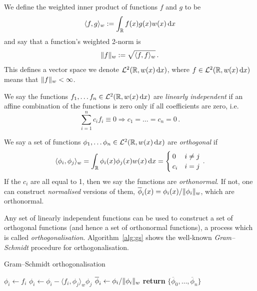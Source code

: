 \begin{definition}
We define the weighted inner product of functions $f$ and $g$ to be
\[ \langle f, g \rangle_w := \int_{\mathbb{R}} f(x) g(x) w(x) \mathop{}\!\mathrm{d} x \]
and say that a function's weighted 2-norm is
\[ \lVert f\rVert_w := \sqrt{\langle f, f \rangle_w} \,. \]
This defines a vector space we denote $\mathcal{L}^2(\mathbb{R}, w(x) \mathop{}\!\mathrm{d} x)$, where $f \in \mathcal{L}^2(\mathbb{R}, w(x) \mathop{}\!\mathrm{d} x)$ means that $\lVert f\rVert_w < \infty$.
\end{definition}

\begin{definition}
We say the functions $f_1, \dots f_n \in \mathcal{L}^2(\mathbb{R}, w(x) \mathop{}\!\mathrm{d} x)$ are \emph{linearly independent} if an affine combination of the functions is zero only if all coefficients are zero, i.e.
\[ \sum_{i=1}^n c_i f_i \equiv 0 \Rightarrow c_1 = \dots = c_n = 0\,. \]
\end{definition}

\begin{definition} \label{def:orthogonal}
We say a set of functions $\phi_1, \dots \phi_n \in \mathcal{L}^2(\mathbb{R}, w(x) \mathop{}\!\mathrm{d} x)$ are \emph{orthogonal} if
\begin{equation} \label{orthogonality}
\langle \phi_i, \phi_j \rangle_w = \int_{\mathbb{R}} \phi_i(x) \phi_j(x) w(x) \mathop{}\!\mathrm{d} x =
\begin{cases}
	0 & i \not=j \\
	c_i & i = j
\end{cases} \,.
\end{equation}
If the $c_i$ are all equal to 1, then we say the functions are \emph{orthonormal}. If not, one can construct \emph{normalised} versions of them, $\overline{\phi}_i(x) = \phi_i(x)/\lVert \phi_i\rVert_w$, which are orthonormal.
\end{definition}

Any set of linearly independent functions can be used to construct a set of orthogonal functions (and hence a set of orthonormal functions), a process which is called \emph{orthogonalisation}. Algorithm~\ref{alg:gs} shows the well-known \emph{Gram--Schmidt} procedure for orthogonalisation.

\begin{algorithm}
\caption{Gram--Schmidt orthogonalisation}
\label{alg:gs}
\begin{algorithmic}[1]
\State $\phi_i \gets f_i$
\State $\phi_i \gets \phi_i - \langle f_i, \phi_j \rangle_w \phi_j$
\EndFor
\State $\overline{\phi}_i \gets \phi_i / \lVert \phi_i\rVert_w$
\EndFor
\State \textbf{return} $\{ \overline{\phi}_0, \dots, \overline{\phi}_n \}$
\EndFunction
\end{algorithmic}
\end{algorithm}



